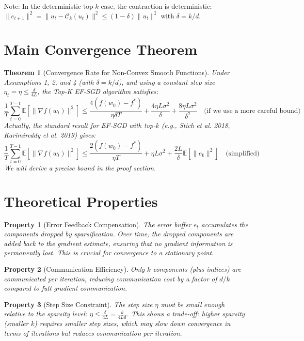 \documentclass{article}
\newtheorem{theorem}{Theorem}
\newtheorem{property}{Property}
\begin{document}
Note: In the deterministic top-$k$ case, the contraction is deterministic: $\|e_{t+1}\|^2 = \|u_t - \mathcal{C}_k(u_t)\|^2 \le (1-\delta) \|u_t\|^2$ with $\delta = k/d$.

\section*{Main Convergence Theorem}
\begin{theorem}[Convergence Rate for Non-Convex Smooth Functions]
Under Assumptions 1, 2, and 4 (with $\delta = k/d$), and using a constant step size $\eta_t = \eta \le \frac{\delta}{4L}$, the Top-K EF-SGD algorithm satisfies:
\[
\frac{1}{T} \sum_{t=0}^{T-1} \mathbb{E}[\|\nabla f(w_t)\|^2] \le \frac{4(f(w_0) - f^*)}{\eta \delta T} + \frac{4\eta L \sigma^2}{\delta} + \frac{8\eta L \sigma^2}{\delta^2} \quad \text{(if we use a more careful bound)}
\]
Actually, the standard result for EF-SGD with top-$k$ (e.g., Stich et al. 2018, Karimireddy et al. 2019) gives:
\[
\frac{1}{T} \sum_{t=0}^{T-1} \mathbb{E}[\|\nabla f(w_t)\|^2] \le \frac{2(f(w_0) - f^*)}{\eta T} + \eta L \sigma^2 + \frac{2L}{\delta} \mathbb{E}[\|e_0\|^2] \quad \text{(simplified)}
\]
We will derive a precise bound in the proof section.
\end{theorem}

\section*{Theoretical Properties}
\begin{property}[Error Feedback Compensation]
The error buffer $e_t$ accumulates the components dropped by sparsification. Over time, the dropped components are added back to the gradient estimate, ensuring that no gradient information is permanently lost. This is crucial for convergence to a stationary point.
\end{property}

\begin{property}[Communication Efficiency]
Only $k$ components (plus indices) are communicated per iteration, reducing communication cost by a factor of $d/k$ compared to full gradient communication.
\end{property}

\begin{property}[Step Size Constraint]
The step size $\eta$ must be small enough relative to the sparsity level: $\eta \le \frac{\delta}{4L} = \frac{k}{4Ld}$. This shows a trade-off: higher sparsity (smaller $k$) requires smaller step sizes, which may slow down convergence in terms of iterations but reduces communication per iteration.
\end{property}
\end{document}
